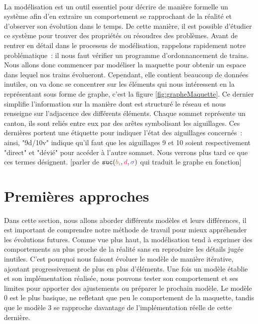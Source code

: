 \documentclass[oneside, a4paper, 11pt]{book}
\newcommand{\sucblock}{{\mathtt{suc}}}
\newcommand{\dirFmt}[1]{{\color{dircolor} #1}}
\newcommand{\posFmt}[1]{{\color{poscolor}{#1}}}
\newcommand{\suc}[3]{\ensuremath{\sucblock(\posFmt{#1}, \dirFmt{#2}, \swFmt{#3})}}
\newcommand{\swFmt}[1]{{\color{swcolor}{#1}}}
\begin{document}
\paragraph{} 
La modélisation est un outil essentiel pour décrire de manière formelle un système afin d'en extraire un comportement se rapprochant de la réalité et d'observer son évolution dans le temps. De cette manière, il est possible d'étudier ce système pour trouver des propriétés ou résoudres des problèmes.
Avant de rentrer en détail dans le processus de modélisation, rappelons rapidement notre problématique~: il nous faut vérifier un programme d'ordonnancement de trains.
Nous allons donc commencer par modéliser la maquette  pour obtenir un espace dans lequel nos trains évolueront. Cependant, elle contient beaucoup de données inutiles, on va donc se concentrer sur les éléments qui nous intéressent en la représentant sous forme de graphe, c'est la figure \ref{fig:grapheMaquette}.
Ce dernier simplifie l'information sur la manière dont est structuré le réseau et nous renseigne sur l'adjacence des différents éléments.
Chaque sommet représente un canton, ils sont reliés entre eux par des arêtes symbolisant les aiguillages. Ces dernières portent une étiquette pour indiquer l'état des aiguillages concernés~: ainsi, "9d/10v" indique qu'il faut que les aiguillages 9 et 10 soient respectivement "direct" et "dévié" pour accéder à l'autre sommet. Nous verrons plus tard ce que ces termes désignent.
[parler de \suc{b_i}{d}{\sigma} qui traduit le graphe en fonction]



\section{Premières approches}

\paragraph{} 
Dans cette section, nous allons aborder différents modèles et leurs différences, il est important de comprendre notre méthode de travail pour mieux appréhender les évolutions futures.
Comme vue plus haut, la modélisation tend à exprimer des comportements au plus proche de la réalité sans en reproduire les détails jugée inutiles.
C'est pourquoi nous faisont évoluer le modèle de manière itérative, ajoutant progressivement de plus en plus d'éléments.
Une fois un modèle établie et son implémentation réalisée, nous pouvons tester son comportement et ses limites pour apporter des ajustements ou préparer le prochain modèle.
Le modèle 0 est le plus basique, ne refletant que peu le comportement de la maquette, tandis que le modèle 3 se rapproche davantage de l'implémentation réelle de cette dernière.
\end{document}
